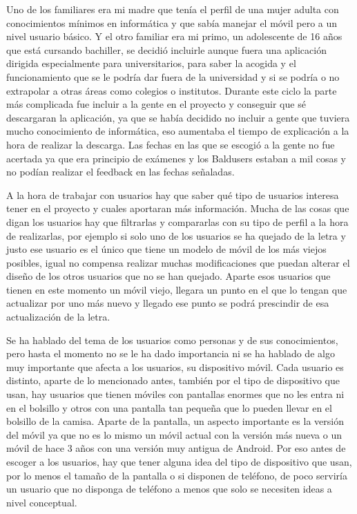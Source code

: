 Uno de los familiares era mi madre que tenía el perfil de una mujer adulta con conocimientos mínimos en informática y que sabía manejar el móvil pero a un nivel usuario básico.
Y el otro familiar era mi primo, un adolescente de 16 años que está cursando bachiller, se decidió incluirle aunque fuera una aplicación dirigida especialmente para universitarios, para saber la acogida y el funcionamiento que se le podría dar fuera de la universidad y si se podría o no extrapolar a otras áreas como colegios o institutos.
Durante este ciclo la parte más complicada fue incluir a la gente en el proyecto y conseguir que sé descargaran la aplicación, ya que se había decidido no incluir a gente que tuviera mucho conocimiento de informática, eso aumentaba el tiempo de explicación a la hora de realizar la descarga.
Las fechas en las que se escogió a la gente no fue acertada ya que era principio de exámenes y los Baldusers estaban a mil cosas y no podían realizar el feedback en las fechas señaladas.

A la hora de trabajar con usuarios hay que saber qué tipo de usuarios interesa tener en el proyecto y cuales aportaran más información.
Mucha de las cosas que digan los usuarios hay que filtrarlas y compararlas con su tipo de perfil a la hora de realizarlas, por ejemplo si solo uno de los usuarios se ha quejado de la letra y justo ese usuario es el único que tiene un modelo de móvil de los más viejos posibles, igual no compensa realizar muchas modificaciones que puedan alterar el diseño de los otros usuarios que no se han quejado. Aparte esos usuarios que tienen en este momento un móvil viejo, llegara un punto en el que lo tengan que actualizar por uno más nuevo y llegado ese punto se podrá prescindir de esa actualización de la letra.

Se ha hablado del tema de los usuarios como personas y de sus conocimientos, pero hasta el momento no se le ha dado importancia ni se ha hablado de algo muy importante que afecta a los usuarios, su dispositivo móvil. 
Cada usuario es distinto, aparte de lo mencionado antes, también por el tipo de dispositivo que usan, hay usuarios que tienen móviles con pantallas enormes que no les entra ni en el bolsillo y otros con una pantalla tan pequeña que lo pueden llevar en el bolsillo de la camisa.
Aparte de la pantalla, un aspecto importante es la versión del móvil ya que no es lo mismo un móvil actual con la versión más nueva o un móvil de hace 3 años con una versión muy antigua de Android.
Por eso antes de escoger a los usuarios, hay que tener alguna idea del tipo de dispositivo que usan, por lo menos el tamaño de la pantalla o si disponen de teléfono, de poco serviría un usuario que no disponga de teléfono a menos que solo se necesiten ideas a nivel conceptual.




